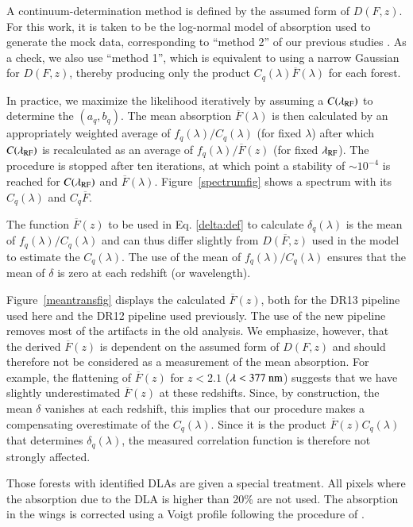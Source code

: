\documentclass{aa}
\newcommand{\lamrf}{\lambda_{\rm RF}}
\newcommand{\fqlam}{f_q(\lambda)}
\newcommand{\dqlam}{\delta_q(\lambda)}
\begin{document}
A continuum-determination method is defined by the assumed form of
$D(F,z)$.
For this work, it is taken to be 
the log-normal model of absorption used to generate the mock data,
corresponding to ``method 2'' of our previous studies
\citep{2015A&A...574A..59D}.
As a check, we also use ``method 1'', which is equivalent
to using a narrow Gaussian for  $D(F,z)$, thereby producing
only the product $C_q(\lambda)\overline{F}(\lambda)$ for each forest.

In practice, we maximize the likelihood iteratively by 
assuming a $C(\lamrf)$ to determine the $(a_q,b_q)$.
The mean absorption $\overline{F}(\lambda)$ is then calculated
by an appropriately weighted average of $\fqlam/C_q(\lambda)$ 
(for fixed $\lambda$) after which
$C(\lamrf)$ is recalculated as 
an average of $\fqlam/\overline{F}(z)$
(for fixed $\lamrf$).
The procedure is stopped after ten iterations,
at which point a stability of $\sim10^{-4}$ is reached
for $C(\lamrf)$ and $\overline{F}(\lambda)$.
Figure~\ref{spectrumfig} shows a spectrum with
its $C_q(\lambda)$  
and $C_q\overline{F}$.

The function $\overline{F}(z)$ to be used in 
Eq. \ref{delta:def} to calculate $\dqlam$ is 
the mean of  $\fqlam/C_q(\lambda)$ and can thus differ slightly
from   $\overline{D(F,z)}$ used in the model to estimate the $C_q(\lambda)$.
The use of the mean of $\fqlam/C_q(\lambda)$
ensures that the mean of $\delta$ is zero at each
redshift (or wavelength).

Figure~\ref{meantransfig} displays the  calculated $\overline{F}(z)$,
both for the DR13 pipeline used here and the DR12 pipeline used
previously.
The use of the new pipeline removes most of the artifacts
in the old analysis.
We emphasize, however, that the derived $\overline{F}(z)$
is dependent on the assumed
form of $D(F,z)$ and should therefore
not be considered as a measurement of the mean absorption.
For example,
the flattening of  $\overline{F}(z)$ for $z<2.1$ ($\lambda<377~{\rm nm}$)
suggests that we have slightly underestimated  $\overline{F}(z)$ at
these redshifts.  Since, by construction, the mean $\delta$ vanishes
at each redshift, this implies  
that our procedure makes a compensating  overestimate
of the $C_q(\lambda)$.  Since it is the product $\overline{F}(z)C_q(\lambda)$
that determines $\dqlam$, 
the  measured correlation function is therefore not strongly affected.


Those forests with identified DLAs are given a special treatment.
All pixels where the absorption due to the DLA is higher than 20\% are not used.
The absorption in the wings is corrected  using a 
Voigt profile following
the procedure of \citet{2012A&A...547L...1N}.  
\end{document}
